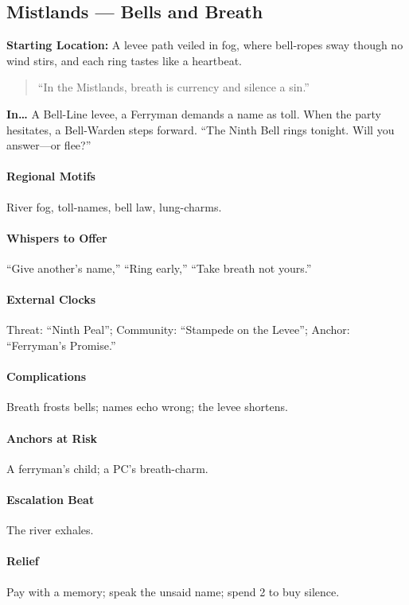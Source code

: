 \subsection*{Mistlands — Bells and Breath}
\textbf{Starting Location:} A levee path veiled in fog, where bell‑ropes sway though no wind stirs, and each ring tastes like a heartbeat.
\begin{quote}
“In the Mistlands, breath is currency and silence a sin.”
\end{quote}

\textbf{In…} A Bell-Line levee, a Ferryman demands a name as toll. When the party hesitates, a Bell-Warden steps forward. ``The Ninth Bell rings tonight. Will you answer—or flee?''
\paragraph{Regional Motifs} River fog, toll-names, bell law, lung-charms.
\paragraph{Whispers to Offer} ``Give another’s name,'' ``Ring early,'' ``Take breath not yours.''
\paragraph{External Clocks} Threat: ``Ninth Peal''; Community: ``Stampede on the Levee''; Anchor: ``Ferryman’s Promise.''
\paragraph{Complications} Breath frosts bells; names echo wrong; the levee shortens.
\paragraph{Anchors at Risk} A ferryman’s child; a PC’s breath-charm.
\paragraph{Escalation Beat} The river exhales.
\paragraph{Relief} Pay with a memory; speak the unsaid name; spend 2 \Boons{} to buy silence.


